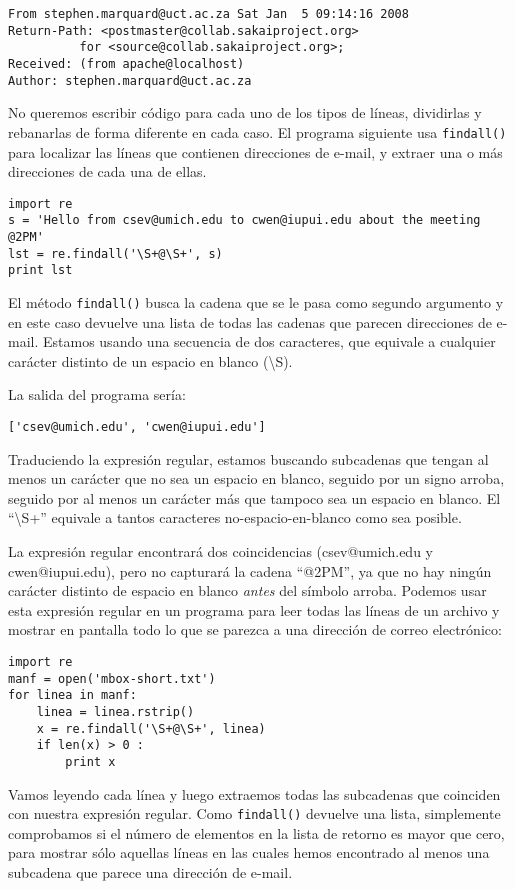 \beforeverb
\begin{verbatim}
From stephen.marquard@uct.ac.za Sat Jan  5 09:14:16 2008
Return-Path: <postmaster@collab.sakaiproject.org>
          for <source@collab.sakaiproject.org>;
Received: (from apache@localhost)
Author: stephen.marquard@uct.ac.za
\end{verbatim}
\afterverb
%
No queremos escribir código para cada uno de los tipos de líneas, dividirlas y rebanarlas de forma diferente
en cada caso. El programa siguiente usa {\tt findall()} para localizar las líneas que contienen
direcciones de e-mail, y extraer una o más direcciones de cada una de ellas.

\beforeverb
\begin{verbatim}
import re
s = 'Hello from csev@umich.edu to cwen@iupui.edu about the meeting @2PM'
lst = re.findall('\S+@\S+', s)
print lst
\end{verbatim}
\afterverb
%
El método {\tt findall()} busca la cadena que se le pasa como segundo argumento y en este caso devuelve
una lista de todas las cadenas que parecen direcciones de e-mail. Estamos usando una secuencia de dos
caracteres, que equivale a cualquier carácter distinto de un espacio en blanco ({\textbackslash}S). 

La salida del programa sería:

\beforeverb
\begin{verbatim}
['csev@umich.edu', 'cwen@iupui.edu']
\end{verbatim}
\afterverb
%
Traduciendo la expresión regular, estamos buscando subcadenas que tengan al menos un
carácter que no sea un espacio en blanco, seguido por un signo arroba, seguido por al menos un carácter más
que tampoco sea un espacio en blanco. El ``{\textbackslash}S+'' equivale a tantos caracteres
no-espacio-en-blanco como sea posible.

La expresión regular encontrará dos coincidencias (csev@umich.edu y cwen@iupui.edu), pero no
capturará la cadena ``@2PM'', ya que no hay ningún carácter distinto de espacio en blanco {\em antes} del
símbolo arroba. Podemos usar esta expresión regular en un programa para leer todas las líneas de un archivo
y mostrar en pantalla todo lo que se parezca a una dirección de correo electrónico: 

\beforeverb
\begin{verbatim}
import re
manf = open('mbox-short.txt')
for linea in manf:
    linea = linea.rstrip()
    x = re.findall('\S+@\S+', linea)
    if len(x) > 0 :
        print x
\end{verbatim}
\afterverb
%
Vamos leyendo cada línea y luego extraemos todas las subcadenas que coinciden con nuestra expresión regular.
Como {\tt findall()} devuelve una lista, simplemente comprobamos si el número de elementos en la lista
de retorno es mayor que cero, para mostrar sólo aquellas líneas en las cuales hemos encontrado al menos una subcadena
que parece una dirección de e-mail.

